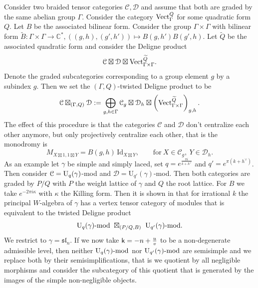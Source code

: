 \documentclass[a4paper, reqno]{amsart}
\theoremstyle{introTheorems}
\newcommand\cC{\mathcal{C}}
\newcommand\cD{\mathcal{D}}
\newcommand{\Vect}{\textup{Vect}}
\newcommand\g\gamma
\renewcommand{\1}{\mathbbold{1}}
\begin{document}
Consider two braided tensor categories $\cC, \cD$ and assume that both are graded by the same abelian group $\Gamma$. 
Consider the category $\Vect_\Gamma^Q$ for some quadratic form $Q$. Let $B$ be the associated bilinear form. Consider the group $\Gamma \times \Gamma$ with bilinear form $\widetilde B: \Gamma \times \Gamma \rightarrow \mathbb C^*, ((g,h),(g', h')) \mapsto B(g, h') B(g', h)$. Let $\widetilde Q$ be the associated quadratic form and consider the Deligne product
\[
\cC \boxtimes \cD \boxtimes \Vect_{\Gamma \times \Gamma}^{\widetilde Q}. 
\]
Denote the graded subcategories corresponding to a group element $g$ by a subindex $g$. Then we set the $(\Gamma, Q)$-twisted Deligne product to be
\[
\cC \boxtimes_{(\Gamma, Q)} \cD := \bigoplus_{g, h \in \Gamma} \cC_g \boxtimes \cD_h \boxtimes \left(\Vect_{\Gamma \times \Gamma}^{\widetilde Q}\right)_{g, h}.
\]
The effect of this procedure is that the categories $\cC$ and $\cD$ don't centralize each other anymore, but only projectively centralize each other, that is the monodromy is
\[
M_{X \boxtimes 1, 1 \boxtimes Y} =  B(g, h)\, \mathrm{Id}_{X \boxtimes Y}, \qquad \text{for} \ X \in \cC_g, \ Y \in \cD_h. 
\]
As an example let $\g$ be simple and simply laced, set $q = e^{\frac{\pi i}{k+h^\vee}}$ and $q' = e^{\pi(k+h^\vee)}$. Then consider $\cC = \Uq(\g)$-mod and $\cD = \mathrm{U}_{q'}(\g)$-mod. 
Then both categories are graded by $P/Q$ with $P$ the weight lattice of $\g$ and $Q$ the root lattice. 
For $B$ we take $e^{-2\pi i\kappa}$ with $\kappa$ the Killing form. Then 
it is shown in \cite{CGN} that for irrational $k$ the principal $W$-algebra of $\g$ has a vertex tensor category of modules that is equivalent to the twisted Deligne product
\[
\Uq(\g)\textup{-mod} \ \boxtimes_{(P/Q, B)} \ \mathrm{U}_{q'}(\g)\textup{-mod}.
\]
We restrict to $\g = \mathfrak{sl}_n$.
If we now take $\mathsf{k} = - n + \frac{u}{v}$ to be a non-degenerate admissible level, then neither 
$\Uq(\g)\textup{-mod}$ nor $\mathrm{U}_{q'}(\g)\textup{-mod}$ are semisimple and we replace both by their semisimplifications, that is we quotient by all negligible morphisms and consider the subcategory of this quotient that is generated by the images of the simple non-negligible objects.
\end{document}
